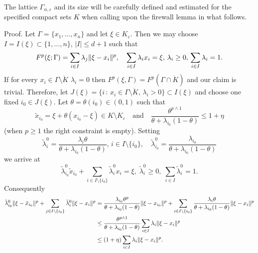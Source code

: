 \begin{remark} The lattice $\Gamma_{\alpha,\varepsilon}$ and its size will be carefully defined and estimated  for the specified compact sets $K$ when calling upon the firewall lemma  in what follows.
\end{remark}

{\sc Proof.}
Let $\Gamma = \{ x_1, \ldots, x_n\}$ and let $\xi\!\in K_\varepsilon$.
Then we may choose $I=I(\xi)\subset \{1, \ldots, n\}$, $|I|\le d+1$ such that
\[
F^p(\xi; \Gamma) = \sum_{i\in I} \lambda_j \lVert\xi - x_i\rVert^p, \quad
\sum_{i\in I} \lambda_i x_i= \xi,\, \lambda_i \geq 0,\, \sum_{i\in I} \lambda_i
= 1.
\]
If for every $x_i \!\in \Gamma \setminus \mathring K$ $\lambda_i=0$ then $F^p(\xi,\Gamma)= F^p(\Gamma\cap \mathring K)$ and our claim is trivial.
Therefore, let $J(\xi)=\{i\,:\, x_i \!\in \Gamma \setminus \mathring K, \,
\lambda_i>0\}\subset I(\xi)$ and choose one fixed  $i_0 \in J(\xi)$.
 Let  $\theta= \theta(i_0)\! \in (0,1)$ such that 
 \[ \tilde x_{i_0} = \xi +
\theta (x_{i_0} - \xi) \in K \setminus K_\varepsilon \quad\mbox{and}\quad \frac{\theta^{p\wedge 1}}{\theta+\lambda_{i_0}(1-\theta)} \le 1+\eta
\]
(when $p\ge 1$ the   right constraint is
empty).
Setting
\[
	\tilde \lambda^0_i = \frac{\lambda_i \theta}{\theta + \lambda_{i_0}(1-\theta)},\,
	i \in I\setminus\{i_0\}, \quad \tilde \lambda^0_{i_0} =
	\frac{\lambda_{i_0}}{\theta + \lambda_{i_0}(1-\theta)}
\]
we arrive at
\[ 
\tilde \lambda^0_{i_0} \tilde x_{i_0} +\sum_{i\in I \setminus \{i_0\}} \tilde
\lambda^0_i x_i = \xi, \;\tilde \lambda^0_i \geq 0, \;\sum_{i\in I}
\tilde \lambda^0_i = 1.
\] 
Consequently 
\begin{equation*}
\begin{split}
\tilde \lambda^0_{i_0} \lVert\xi - \tilde x_{i_0}\rVert^p + \sum_{j\in I \setminus
\{i_0\}} \tilde \lambda^0_i \lVert\xi - x_i\rVert^p  &=
\frac{\lambda_{i_0}\theta^p}{\theta + \lambda_{i_0}(1-\theta)} \lVert\xi -
x_{i_0}\rVert^p
+ \sum_{i\in I \setminus
		\{i_0\}}\frac{\lambda_i \theta}{\theta + \lambda_{i_0}(1-\theta)}\lVert\xi - x_i\rVert^p \\
& \leq \frac{\theta^{p\wedge 1}}{\theta + \lambda_{i_0}(1-\theta)} \sum_{i\in I}\lambda_i
		\lVert\xi - x_i\rVert^p\\
&		\le(1+\eta)\sum_{i\in I}\lambda_i
		\lVert\xi - x_i\rVert^p.
\end{split}
\end{equation*}
